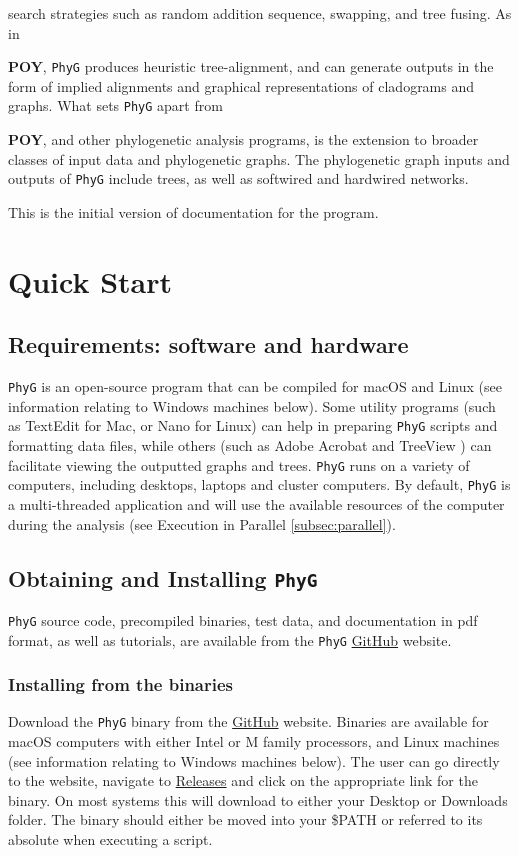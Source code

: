 \documentclass[11pt]{book}
\newcommand{\phyg}{\texttt{PhyG} }
\begin{document}
	search strategies such as random addition sequence, swapping, and tree fusing. As in {\textbf{POY}, 
	\phyg produces heuristic tree-alignment, and can generate outputs in the form of implied alignments 
	and graphical representations of cladograms and graphs. What sets \phyg apart from {\textbf{POY}, 
	and other phylogenetic analysis programs, is the extension to broader classes of input data and 
	phylogenetic graphs. The phylogenetic graph inputs and outputs of \texttt{PhyG} include trees, as 
	well as softwired and hardwired networks.
		
	This is the initial version of documentation for the program.

\section{Quick Start}
	
	\subsection{Requirements: software and hardware}
		\phyg is an open-source program that can be compiled for macOS and Linux 
		(see information relating to Windows machines below). Some utility programs 
		(such as TextEdit for Mac, or Nano for Linux) can help in preparing \phyg scripts 
		and formatting data files, while others (such as Adobe Acrobat and TreeView 
		\citep{page1996}) can facilitate viewing the outputted graphs and trees. 		
		\phyg runs on a variety of computers, including desktops, laptops and cluster computers.
		By default, \phyg is a multi-threaded application and will use the available resources of 
		the computer during the analysis (see Execution in Parallel \ref{subsec:parallel}). 
		
	\subsection{Obtaining and Installing \phyg}
		\phyg source code, precompiled binaries, test data, and documentation in pdf format, 
		as well as tutorials, are available from the \phyg \href{https://github.com/amnh/PhyGraph}
		{GitHub} website.

	\subsubsection{Installing from the binaries}
		Download the \phyg binary from the \href{https://github.com/amnh/PhyGraph}{GitHub} 
		website. Binaries are available for macOS computers with either Intel or M family 
		processors, and Linux machines (see information relating to Windows machines below). 
		The user can go directly to the website, navigate to 
		\href{https://github.com/amnh/PhyGraph/releases}{Releases} and click on the appropriate 
		link for the binary. On most systems this will download to either your Desktop or Downloads 
		folder. The binary should either be moved into your \$PATH or referred to its absolute when 
		executing a script.
		
}}
\end{document}
